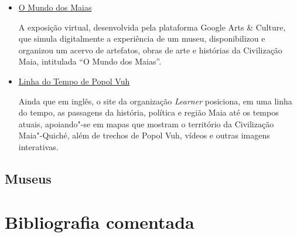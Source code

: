 \documentclass[12pt]{extarticle}
\begin{document}
\begin{itemize}
\item\href{https://artsandculture.google.com/project/exploring-the-maya-world}{O Mundo dos Maias}

A exposição virtual, desenvolvida pela plataforma Google Arts & Culture, que simula digitalmente 
a experiência de um museu, disponibilizou e organizou um acervo de artefatos, obras de arte e 
histórias da Civilização Maia, intitulada ``O Mundo dos Maias''.

\item\href{https://www.learner.org/series/invitation-to-world-literature/popol-vuh/popol-vuh-map-timeline}{Linha do Tempo de Popol Vuh}

Ainda que em inglês, o site da organização \textit{Learner} posiciona, em uma linha do tempo, as 
passagens da história, política e região Maia até os tempos atuais, apoiando"-se em mapas que mostram o território da 
Civilização Maia"-Quiché, além de trechos de Popol Vuh, vídeos e outras imagens interativas. 
\end{itemize}

\subsection{Museus}

\section{Bibliografia comentada}
\end{document}
